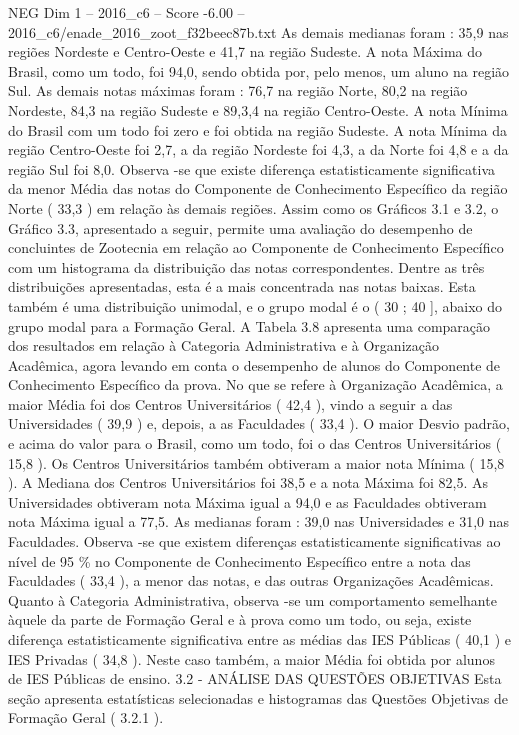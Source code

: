 \begin{textsample}{NEG Dim 1 – 2016\_c6 – Score -6.00 – 2016\_c6/enade\_2016\_zoot\_f32beec87b.txt}
As demais medianas foram : 35,9 nas regiões Nordeste e Centro-Oeste e 41,7 na região Sudeste.
A nota Máxima do Brasil, como um todo, foi 94,0, sendo obtida por, pelo menos, um aluno na região Sul.
As demais notas máximas foram : 76,7 na região Norte, 80,2 na região Nordeste, 84,3 na região Sudeste e 89,3,4 na região Centro-Oeste.
A nota Mínima do Brasil com um todo foi zero e foi obtida na região Sudeste.
A nota Mínima da região Centro-Oeste foi 2,7, a da região Nordeste foi 4,3, a da Norte foi 4,8 e a da região Sul foi 8,0.
Observa -se que existe diferença estatisticamente significativa da menor Média das notas do Componente de Conhecimento Específico da região Norte ( 33,3 ) em relação às demais regiões.
Assim como os Gráficos 3.1 e 3.2, o Gráfico 3.3, apresentado a seguir, permite uma avaliação do desempenho de concluintes de Zootecnia em relação ao Componente de Conhecimento Específico com um histograma da distribuição das notas correspondentes.
Dentre as três distribuições apresentadas, esta é a mais concentrada nas notas baixas.
Esta também é uma distribuição unimodal, e o grupo modal é o ( 30 ; 40 ], abaixo do grupo modal para a Formação Geral.
A Tabela 3.8 apresenta uma comparação dos resultados em relação à Categoria Administrativa e à Organização Acadêmica, agora levando em conta o desempenho de alunos do Componente de Conhecimento Específico da prova.
No que se refere à Organização Acadêmica, a maior Média foi dos Centros Universitários ( 42,4 ), vindo a seguir a das Universidades ( 39,9 ) e, depois, a as Faculdades ( 33,4 ).
O maior Desvio padrão, e acima do valor para o Brasil, como um todo, foi o das Centros Universitários ( 15,8 ).
Os Centros Universitários também obtiveram a maior nota Mínima ( 15,8 ).
A Mediana dos Centros Universitários foi 38,5 e a nota Máxima foi 82,5.
As Universidades obtiveram nota Máxima igual a 94,0 e as Faculdades obtiveram nota Máxima igual a 77,5.
As medianas foram : 39,0 nas Universidades e 31,0 nas Faculdades.
Observa -se que existem diferenças estatisticamente significativas ao nível de 95 \% no Componente de Conhecimento Específico entre a nota das Faculdades ( 33,4 ), a menor das notas, e das outras Organizações Acadêmicas.
Quanto à Categoria Administrativa, observa -se um comportamento semelhante àquele da parte de Formação Geral e à prova como um todo, ou seja, existe diferença estatisticamente significativa entre as médias das IES Públicas ( 40,1 ) e IES Privadas ( 34,8 ).
Neste caso também, a maior Média foi obtida por alunos de IES Públicas de ensino. 3.2 - ANÁLISE DAS QUESTÕES OBJETIVAS Esta seção apresenta estatísticas selecionadas e histogramas das Questões Objetivas de Formação Geral ( 3.2.1 ).

\end{textsample}
